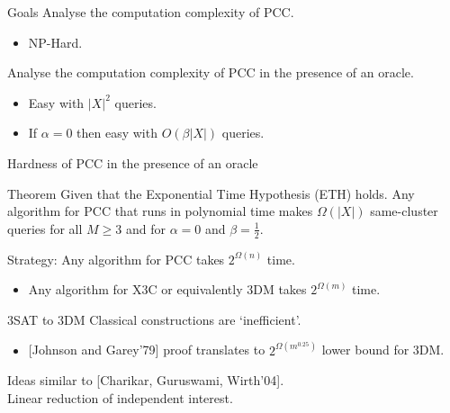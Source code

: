 \documentclass{beamer}
\begin{document}
\begin{frame}{Goals}
	Analyse the computation complexity of PCC.
	\begin{itemize}
		\vspace{10pt}\item NP-Hard.
	\end{itemize}	 
	\vspace{30pt}Analyse the computation complexity of PCC in the presence of an oracle.
	\begin{itemize}
		\vspace{10pt}\item Easy with $|X|^2$ queries.
		\vspace{10pt}\item If $\alpha = 0$ then easy with $O(\beta|X|)$ queries.
	\end{itemize}
\end{frame}

\begin{frame}{Hardness of PCC in the presence of an oracle}
	\begin{block}{Theorem}
		Given that the Exponential Time Hypothesis (ETH) holds. Any algorithm for PCC that runs in polynomial time makes $\Omega(|X|)$ same-cluster queries for all $M \ge 3$ and for $\alpha = 0$ and $\beta = \frac{1}{2}$. 
	\end{block}
	\vspace{20pt}Strategy: Any algorithm for PCC takes $2^{\Omega(n)}$ time.
	\begin{itemize}
		\vspace{10pt}\item Any algorithm for X3C or equivalently 3DM takes $2^{\Omega(m)}$ time.
	\end{itemize}
\end{frame}

\begin{frame}{3SAT to 3DM}
	Classical constructions are `inefficient'.\\
	\begin{itemize}
	\vspace{10pt}\item \alert{[Johnson and Garey'79]} proof translates to $2^{\Omega(m^{0.25})}$ lower bound for 3DM.
	\end{itemize}
	\vspace{20pt}Ideas similar to \alert{[Charikar, Guruswami, Wirth'04]}.\\
	\vspace{20pt}Linear reduction of independent interest.	
\end{frame}
\end{document}
